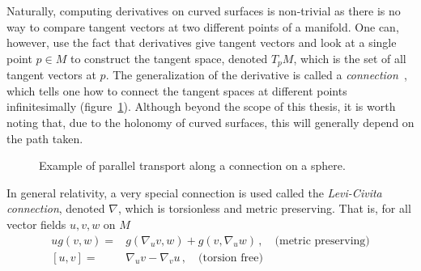 Naturally, computing derivatives on curved surfaces is non-trivial as there is no way to compare tangent vectors at two different points of a manifold. One can, however, use the fact that derivatives give tangent vectors and look at a single point $p\in M$ to construct the tangent space, denoted $T_pM$, which is the set of all tangent vectors at $p$. The generalization of the derivative is called a \textit{connection}~\cite{baez_john_gauge_1994}, which tells one how to connect the tangent spaces at different points infinitesimally (figure~\ref{fig:parallel_transport}). Although beyond the scope of this thesis, it is worth noting that, due to the holonomy of curved surfaces, this will generally depend on the path taken.
\begin{figure}
    \centering
    \caption{Example of parallel transport along a connection on a sphere. }
    \label{fig:parallel_transport}
\end{figure}
In general relativity, a very special connection is used called the \textit{Levi-Civita connection}, denoted $\nabla$, which is torsionless and metric preserving. That is, for all vector fields $u,v,w$ on $M$
\begin{equation}
    \begin{split}
        u g(v,w) =& g(\nabla_u v, w)+g(v,\nabla_uw) \,,\quad \text{(metric preserving)} \\
        [u,v] =& \nabla_u v - \nabla_v u \,,\quad \text{(torsion free)}
    \end{split}
\end{equation}

